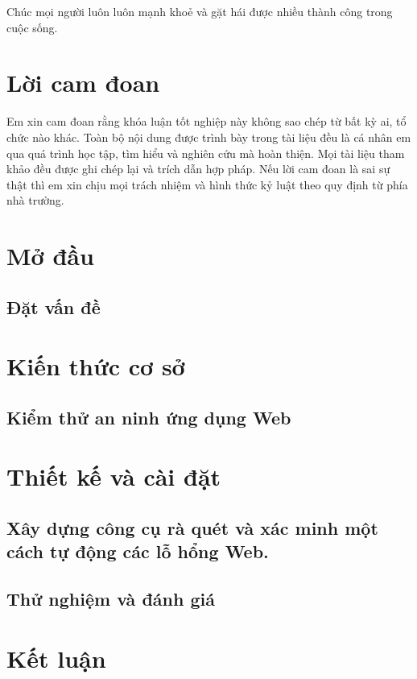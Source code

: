 \documentclass[12pt,a4paper]{report}
\begin{document}
Chúc mọi người luôn luôn mạnh khoẻ và gặt hái được nhiều thành công trong cuộc sống.

\chapter*{Lời cam đoan}

Em xin cam đoan rằng khóa luận tốt nghiệp này không sao chép từ bất kỳ ai,
tổ chức nào khác. Toàn bộ nội dung được trình bày trong tài liệu đều là cá nhân em qua quá
trình học tập, tìm hiểu và nghiên cứu mà hoàn thiện. Mọi tài liệu tham khảo đều được ghi chép
lại và trích dẫn hợp pháp. Nếu lời cam đoan là sai sự thật thì em xin chịu mọi trách nhiệm và
hình thức kỷ luật theo quy định từ phía nhà trường.

\tableofcontents{}
\clearpage{}

\listoffigures{}

\listoftables{}

\chapter{Mở đầu}

\section{Đặt vấn đề}


\chapter{Kiến thức cơ sở}

\section{Kiểm thử an ninh ứng dụng Web}


\chapter{Thiết kế và cài đặt}
\section{Xây dựng công cụ rà quét và xác minh một cách tự động các lỗ hổng Web.}


\section{Thử nghiệm và đánh giá}


\chapter{Kết luận}



\nocite{*}
\printbibliography[heading=bibintoc, title=Tài liệu tham khảo]

\end{document}
